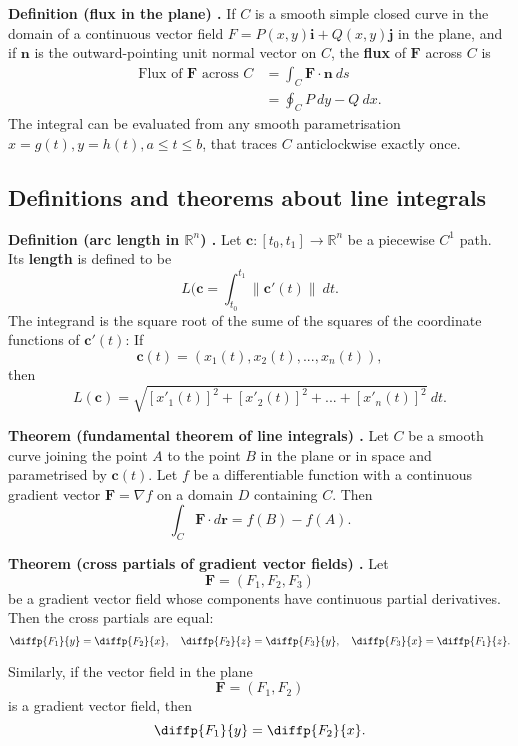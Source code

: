 \begin{shaded}
\textbf{Definition (flux in the plane) \cite{thomas_calculus}.} If $C$ is a smooth  simple closed curve in the domain of a continuous vector field $F = P(x, y) \mathbf{i} + Q(x, y) \mathbf{j}$ in the plane, and if $\mathbf{n}$ is the outward-pointing unit normal vector on $C$, the \textbf{flux} of $\mathbf{F}$ across $C$ is
\begin{align*}
\text{Flux of } \mathbf{F} \text{ across } C &= \int_C \mathbf{F} \cdot \mathbf{n} \ ds \\
&= \oint_C P \ dy - Q \ dx .
\end{align*}
The integral can be evaluated from any smooth parametrisation $x = g(t), y = h(t), a \leq t \leq b$, that traces $C$ anticlockwise exactly once.
\end{shaded}

\subsection{Definitions and theorems about line integrals}

\begin{shaded}
\textbf{Definition (arc length in $\mathbb{R}^n$) \cite{marsden_vector_calculus}.} Let $\mathbf{c}: [t_0, t_1] \to \mathbb{R}^n$ be a piecewise $C^1$ path. Its \textbf{length} is defined to be
$$ L(\mathbf{c} = \int_{t_0}^{t_1} \lVert \mathbf{c}'(t) \rVert \ dt . $$
The integrand is the square root of the sume of the squares of the coordinate functions of $\mathbf{c}'(t)$: If
$$ \mathbf{c}(t) = (x_1(t), x_2(t), ..., x_n(t)) , $$
then
$$ L(\mathbf{c}) = \sqrt{[x'_1(t)]^2 + [x'_2(t)]^2 + ... + [x'_n(t)]^2} \ dt . $$
\end{shaded}

\begin{shaded}
\textbf{Theorem (fundamental theorem of line integrals) \cite{thomas_calculus}.} Let $C$ be a smooth curve joining the point $A$ to the point $B$ in the plane or in space and parametrised by $\mathbf{c}(t)$. Let $f$ be a differentiable function with a continuous gradient vector $\mathbf{F} = \nabla f$ on a domain $D$ containing $C$. Then
$$ \int_C \mathbf{F} \cdot d \mathbf{r} = f(B) - f(A) . $$
\end{shaded}

\begin{shaded}
\textbf{Theorem (cross partials of gradient vector fields) \cite{math2111_notes}.} Let
$$ \mathbf{F} = (F_1, F_2, F_3) $$
be a gradient vector field whose components have continuous partial derivatives. Then the cross partials are equal:
$$ \diffp{F_1}{y} = \diffp{F_2}{x}, \quad \diffp{F_2}{z} = \diffp{F_3}{y}, \quad \diffp{F_3}{x} = \diffp{F_1}{z} . $$

Similarly, if the vector field in the plane
$$ \mathbf{F} = (F_1, F_2) $$
is a gradient vector field, then
$$ \diffp{F_1}{y} = \diffp{F_2}{x} . $$
\end{shaded}

